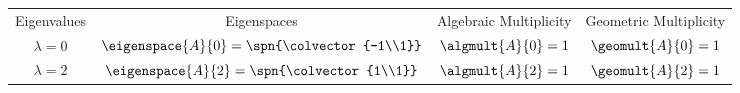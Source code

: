 \begin{tabular}{cccc}
Eigenvalues  & Eigenspaces & Algebraic Multiplicity & Geometric Multiplicity\\
$\lambda = 0$ & $\eigenspace{A}{0} = \spn{\colvector{-1\\1}}$ & $\algmult{A}{0} = 1$ & $\geomult{A}{0} = 1$\\
$\lambda = 2$ & $\eigenspace{A}{2} = \spn{\colvector{1\\1}}$ & $\algmult{A}{2} = 1$ & $ \geomult{A}{2} = 1$
\end{tabular}